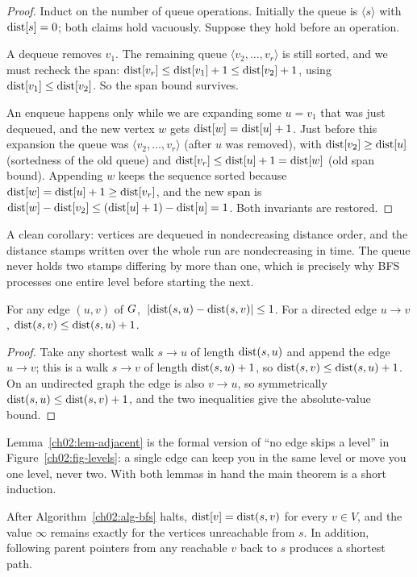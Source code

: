 \begin{proof}
Induct on the number of queue operations. Initially the queue is $\langle s\rangle$
with $\operatorname{dist}[s]=0$; both claims hold vacuously. Suppose they hold before an
operation.

A dequeue removes $v_1$. The remaining queue $\langle v_2,\dots,v_r\rangle$ is
still sorted, and we must recheck the span: $\operatorname{dist}[v_r]\le \operatorname{dist}[v_1]+1 \le
\operatorname{dist}[v_2]+1$, using $\operatorname{dist}[v_1]\le\operatorname{dist}[v_2]$. So the span bound survives.

An enqueue happens only while we are expanding some $u=v_1$ that was just
dequeued, and the new vertex $w$ gets $\operatorname{dist}[w]=\operatorname{dist}[u]+1$. Just before this
expansion the queue was $\langle v_2,\dots,v_r\rangle$ (after $u$ was removed),
with $\operatorname{dist}[v_2]\ge \operatorname{dist}[u]$ (sortedness of the old queue) and
$\operatorname{dist}[v_r]\le \operatorname{dist}[u]+1 = \operatorname{dist}[w]$ (old span bound). Appending $w$ keeps the
sequence sorted because $\operatorname{dist}[w]=\operatorname{dist}[u]+1\ge \operatorname{dist}[v_r]$, and the new span is
$\operatorname{dist}[w]-\operatorname{dist}[v_2] \le (\operatorname{dist}[u]+1) - \operatorname{dist}[u] = 1$. Both invariants are
restored.
\end{proof}

A clean corollary: vertices are dequeued in nondecreasing distance order, and the
distance stamps written over the whole run are nondecreasing in time. The queue
never holds two stamps differing by more than one, which is precisely why BFS
processes one entire level before starting the next.

\begin{lemma}
\label{ch02:lem-adjacent}
For any edge $(u,v)$ of $G$, $\,\lvert\operatorname{dist}(s,u) - \operatorname{dist}(s,v)\rvert \le 1$. For a
directed edge $u\to v$, $\operatorname{dist}(s,v) \le \operatorname{dist}(s,u) + 1$.
\end{lemma}

\begin{proof}
Take any shortest walk $s\to u$ of length $\operatorname{dist}(s,u)$ and append the edge
$u\to v$; this is a walk $s\to v$ of length $\operatorname{dist}(s,u)+1$, so
$\operatorname{dist}(s,v)\le \operatorname{dist}(s,u)+1$. On an undirected graph the edge is also $v\to u$, so
symmetrically $\operatorname{dist}(s,u)\le \operatorname{dist}(s,v)+1$, and the two inequalities give the
absolute-value bound.
\end{proof}

Lemma~\ref{ch02:lem-adjacent} is the formal version of ``no edge skips a level''
in Figure~\ref{ch02:fig-levels}: a single edge can keep you in the same level or
move you one level, never two. With both lemmas in hand the main theorem is a
short induction.

\begin{theorem}
\label{ch02:thm-correct}
After Algorithm~\ref{ch02:alg-bfs} halts, $\operatorname{dist}[v]=\operatorname{dist}(s,v)$ for every
$v\in V$, and the value $\infty$ remains exactly for the vertices unreachable
from $s$. In addition, following parent pointers from any reachable $v$ back to $s$
produces a shortest path.
\end{theorem}

